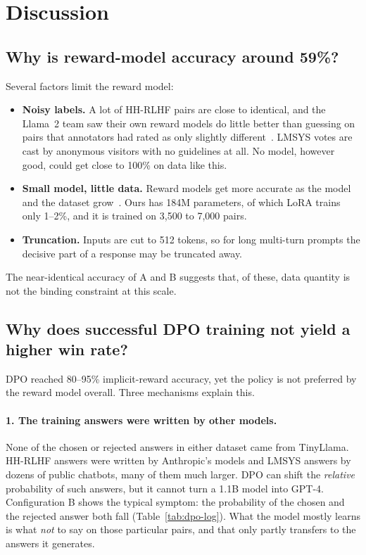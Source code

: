 \section{Discussion}
\label{sec:discussion}

\subsection{Why is reward-model accuracy around 59\%?}
Several factors limit the reward model:
\begin{itemize}
  \item \textbf{Noisy labels.} A lot of HH-RLHF pairs are close to identical, and the Llama~2 team saw their own reward models do little better than guessing on pairs that annotators had rated as only slightly different~\cite{touvron2023llama2}. LMSYS votes are cast by anonymous visitors with no guidelines at all. No model, however good, could get close to 100\% on data like this.
  \item \textbf{Small model, little data.} Reward models get more accurate as the model and the dataset grow~\cite{bai2022hh,gao2023overoptimization}. Ours has 184M parameters, of which LoRA trains only 1--2\%, and it is trained on 3,500 to 7,000 pairs.
  \item \textbf{Truncation.} Inputs are cut to 512 tokens, so for long multi-turn prompts the decisive part of a response may be truncated away.
\end{itemize}
The near-identical accuracy of A and B suggests that, of these, data quantity is not the binding constraint at this scale.

\subsection{Why does successful DPO training not yield a higher win rate?}
DPO reached 80--95\% implicit-reward accuracy, yet the policy is not preferred by the reward model overall. Three mechanisms explain this.

\paragraph{1. The training answers were written by other models.} None of the chosen or rejected answers in either dataset came from TinyLlama. HH-RLHF answers were written by Anthropic's models and LMSYS answers by dozens of public chatbots, many of them much larger. DPO can shift the \emph{relative} probability of such answers, but it cannot turn a 1.1B model into GPT-4. Configuration B shows the typical symptom: the probability of the chosen and the rejected answer both fall (Table~\ref{tab:dpo-log}). What the model mostly learns is what \emph{not} to say on those particular pairs, and that only partly transfers to the answers it generates.

